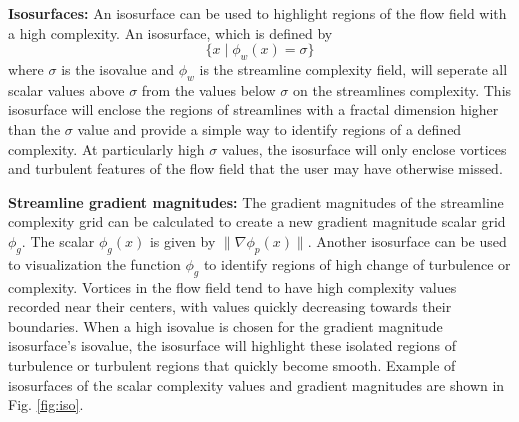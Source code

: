 \documentclass[journal]{vgtc}                %
\begin{document}
\textbf{Isosurfaces:} 
An isosurface can be used to highlight regions of the flow field with a high complexity.
An isosurface, which is defined by
\begin{equation} \{ x \mid \phi_w(x) = \sigma \}\end{equation}
where $\sigma$ is the isovalue and $\phi_w$ is the streamline complexity field, will seperate all scalar values above $\sigma$ from the values below $\sigma$ on the streamlines complexity.
This isosurface will enclose the regions of streamlines with a fractal dimension higher than the $\sigma$ value and provide a simple way to identify regions of a defined complexity.
At particularly high $\sigma$ values, the isosurface will only enclose vortices and turbulent features of the flow field that the user may have otherwise missed.

\textbf{Streamline gradient magnitudes:}
The gradient magnitudes of the streamline complexity grid can be calculated to create a new gradient magnitude scalar grid $\phi_g$.
The scalar $\phi_g(x)$ is given by $\| \nabla \phi_p(x) \|$.
Another isosurface can be used to visualization the function $\phi_g$ to identify regions of high change of turbulence or complexity.
Vortices in the flow field tend to have high complexity values recorded near their centers, with values quickly decreasing towards their boundaries.
When a high isovalue is chosen for the gradient magnitude isosurface's isovalue, the isosurface will highlight these isolated regions of turbulence or turbulent regions that quickly become smooth.
Example of isosurfaces of the scalar complexity values and gradient magnitudes are shown in Fig. \ref{fig:iso}.
\end{document}
